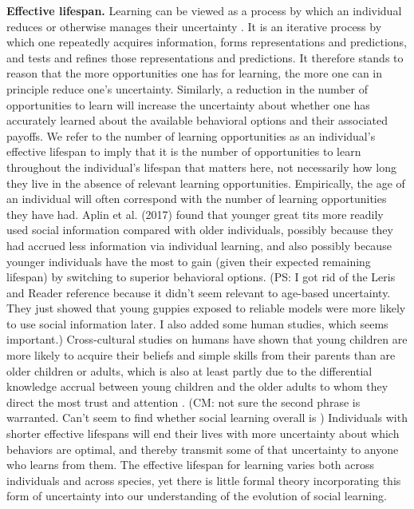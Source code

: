 \documentclass[letterpaper,11.5pt]{scrartcl}
\newcommand{\mt}[1]{{\textcolor{myorange} {({\tiny MT:} #1)}}}
\newcommand{\cm}[1]{{\textcolor{mypurple} {({\tiny CM:} #1)}}}
\newcommand{\ps}[1]{{\textcolor{mygreen} {({\tiny PS:} #1)}}}
\begin{document}
\textbf{Effective lifespan.}
Learning can be viewed as a process by which an individual reduces or otherwise manages their uncertainty \cite{jacobs2011bayesian,clark2013whatever}. It is an iterative process by which one repeatedly acquires information, forms representations and predictions, and tests and refines those representations and predictions. It therefore stands to reason that the more opportunities one has for learning, the more one can in principle reduce one's uncertainty. Similarly, a reduction in the number of opportunities to learn will increase the uncertainty about whether one has accurately learned about the available behavioral options and their associated payoffs. We refer to the number of learning opportunities as an individual's effective lifespan to imply that it is the number of opportunities to learn throughout the individual's lifespan that matters here, not necessarily how long they live in the absence of relevant learning opportunities. Empirically, the age of an individual will often correspond with the number of learning opportunities they have had.  Aplin et al. (2017) \nocite{Aplin2017} found that younger great tits more readily used social information compared with older individuals, possibly because they had  accrued less information via individual learning, and also possibly because younger individuals have the most to gain (given their expected remaining lifespan) by switching to superior behavioral options. \ps{I got rid of the Leris and Reader reference because it didn't seem relevant to age-based uncertainty. They just showed that young guppies exposed to reliable models were more likely to use social information later. I also added some human studies, which seems important.} Cross-cultural studies on humans have shown that young children are more likely to acquire their beliefs and simple skills from their parents than are older children or adults, which is also at least partly due to the differential knowledge accrual between young children and the older adults to whom they direct the most trust and attention \cite{kline2013teaching, Reyes2016}. \cm{not sure the second phrase is warranted. Can't seem to find whether social learning overall is  }
Individuals with shorter effective lifespans will end their lives with more uncertainty about which behaviors are optimal, and thereby transmit some of that uncertainty to anyone who learns from them. The effective lifespan for learning varies both across individuals and across species, yet there is little formal theory incorporating this form of uncertainty into our understanding of the evolution of social learning. 
\end{document}
